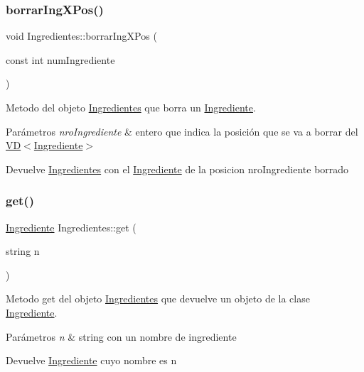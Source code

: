 \subsubsection{\texorpdfstring{borrar\+Ing\+X\+Pos()}{borrarIngXPos()}}
{\footnotesize\ttfamily void Ingredientes\+::borrar\+Ing\+X\+Pos (\begin{DoxyParamCaption}\item[{const int}]{num\+Ingrediente }\end{DoxyParamCaption})}



Metodo del objeto \hyperlink{classIngredientes}{Ingredientes} que borra un \hyperlink{classIngrediente}{Ingrediente}. 


\begin{DoxyParams}{Parámetros}
{\em nro\+Ingrediente} & entero que indica la posición que se va a borrar del \hyperlink{classVD}{V\+D$<$\+Ingrediente$>$} \\
\hline
\end{DoxyParams}
\begin{DoxyReturn}{Devuelve}
\hyperlink{classIngredientes}{Ingredientes} con el \hyperlink{classIngrediente}{Ingrediente} de la posicion nro\+Ingrediente borrado 
\end{DoxyReturn}
\mbox{\label{classIngredientes_a1eddfac49913e486490721f6c114bf30}} 
\subsubsection{\texorpdfstring{get()}{get()}}
{\footnotesize\ttfamily \hyperlink{classIngrediente}{Ingrediente} Ingredientes\+::get (\begin{DoxyParamCaption}\item[{string}]{n }\end{DoxyParamCaption})}



Metodo get del objeto \hyperlink{classIngredientes}{Ingredientes} que devuelve un objeto de la clase \hyperlink{classIngrediente}{Ingrediente}. 


\begin{DoxyParams}{Parámetros}
{\em n} & string con un nombre de ingrediente \\
\hline
\end{DoxyParams}
\begin{DoxyReturn}{Devuelve}
\hyperlink{classIngrediente}{Ingrediente} cuyo nombre es n 
\end{DoxyReturn}
\mbox{\label{classIngredientes_a561c8183bb25088863c6532a486021ea}} 
